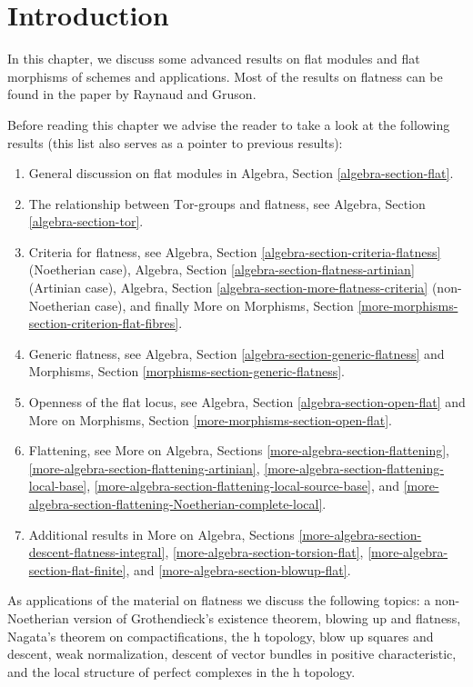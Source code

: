 \section{Introduction}
\label{flat-section-introduction}
In this chapter, we discuss some advanced results on flat modules and
flat morphisms of schemes and applications. Most of the results on flatness
can be found in the paper \cite{GruRay} by Raynaud and Gruson.

\medskip\noindent
Before reading this chapter we advise the reader to take a look
at the following results (this list also serves as a pointer to
previous results):
\begin{enumerate}
\item General discussion on flat modules in
Algebra, Section \ref{algebra-section-flat}.
\item The relationship between $\text{Tor}$-groups and flatness, see
Algebra, Section \ref{algebra-section-tor}.
\item Criteria for flatness, see
Algebra, Section \ref{algebra-section-criteria-flatness}
(Noetherian case),
Algebra, Section \ref{algebra-section-flatness-artinian}
(Artinian case),
Algebra, Section \ref{algebra-section-more-flatness-criteria}
(non-Noetherian case), and finally
More on Morphisms, Section \ref{more-morphisms-section-criterion-flat-fibres}.
\item Generic flatness, see
Algebra, Section \ref{algebra-section-generic-flatness}
and
Morphisms, Section \ref{morphisms-section-generic-flatness}.
\item Openness of the flat locus, see
Algebra, Section \ref{algebra-section-open-flat}
and
More on Morphisms, Section \ref{more-morphisms-section-open-flat}.
\item Flattening, see
More on Algebra, Sections
\ref{more-algebra-section-flattening},
\ref{more-algebra-section-flattening-artinian},
\ref{more-algebra-section-flattening-local-base},
\ref{more-algebra-section-flattening-local-source-base}, and
\ref{more-algebra-section-flattening-Noetherian-complete-local}.
\item Additional results in
More on Algebra, Sections \ref{more-algebra-section-descent-flatness-integral},
\ref{more-algebra-section-torsion-flat},
\ref{more-algebra-section-flat-finite}, and
\ref{more-algebra-section-blowup-flat}.
\end{enumerate}
As applications of the material on flatness we discuss the following
topics: a non-Noetherian version of Grothendieck's existence theorem,
blowing up and flatness, Nagata's theorem on compactifications,
the h topology, blow up squares and descent, weak normalization,
descent of vector bundles in positive characteristic, and
the local structure of perfect complexes in the h topology.

